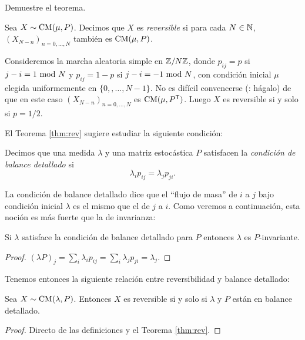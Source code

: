 \begin{exer}
Demuestre el teorema.
\end{exer}

\begin{defn}
Sea $X\sim\text{\upshape{CM}}(\mu,P)$.
Decimos que $X$ es \emph{reversible} si para cada $N\in\mathbb{N}$, $(X_{N-n})_{n=0,\dotsc,N}$ también es $\text{\upshape{CM}}(\mu,P)$.
\end{defn}

\begin{ex}
Consideremos la marcha aleatoria simple en $\mathbb{Z}/N\mathbb{Z}$, donde $p_{ij}=p$ si $j-i=1~\text{\upshape{mod}}~N$ y $p_{ij}=1-p$ si $j-i=-1~\text{\upshape{mod}}~N$, con condición inicial $\mu$ elegida uniformemente en $\{0,,\dotsc,N-1\}$.
No es difícil convencerse (\uexers: hágalo) de que en este caso $(X_{N-n})_{n=0,\dotsc,N}$ es $\text{\upshape{CM}}(\mu,P^{\sf T})$.
Luego $X$ es reversible si y solo si $p=1/2$.
\end{ex}

El Teorema \ref{thm:rev} sugiere estudiar la siguiente condición:

\begin{defn}
Decimos que una medida $\lambda$ y una matriz estocástica $P$ satisfacen la \emph{condición de balance detallado} si
\[\lambda_ip_{ij}=\lambda_jp_{ji}.\]
\end{defn}

La condición de balance detallado dice que el ``flujo de masa'' de $i$ a $j$ bajo condición inicial $\lambda$ es el mismo que el de $j$ a $i$.
Como veremos a continuación, esta noción es más fuerte que la de invarianza:

\begin{prop}
Si $\lambda$ satisface la condición de balance detallado para $P$ entonces $\lambda$ es $P$-invariante.
\end{prop}

\begin{proof}
$(\lambda P)_j=\sum_i\lambda_ip_{ij}=\sum_i\lambda_jp_{ji}=\lambda_j$.
\end{proof}

Tenemos entonces la siguiente relación entre reversibilidad y balance detallado:

\begin{thm}
Sea $X\sim\text{\upshape{CM}}(\lambda,P)$.
Entonces $X$ es reversible si y solo si $\lambda$ y $P$ están en balance detallado.
\end{thm}

\begin{proof}
Directo de las definiciones y el Teorema \ref{thm:rev}.
\end{proof}

